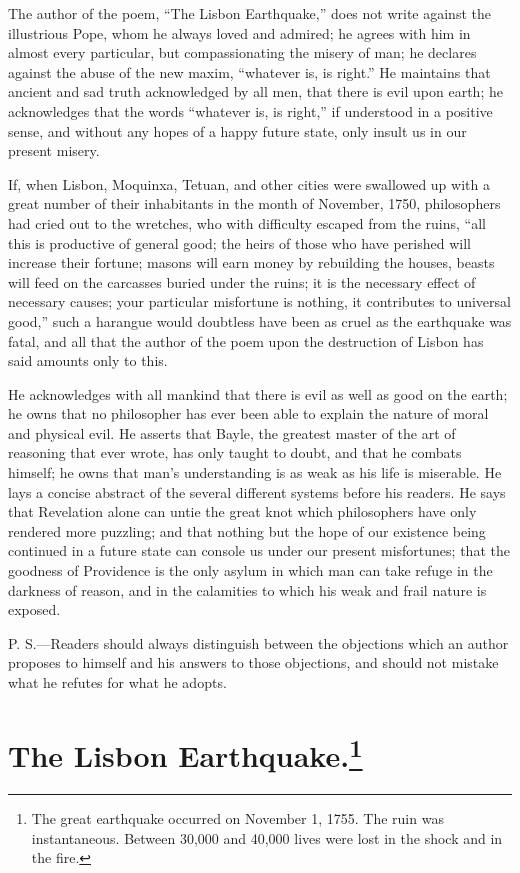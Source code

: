 The author of the poem, ``The Lisbon Earthquake,'' does not write
against the illustrious Pope, whom he always loved and admired; he
agrees with him in almost every particular, but compassionating the
misery of man; he declares against the abuse of the new maxim,
``whatever is, is right.'' He maintains that ancient and sad truth
acknowledged by all men, that there is evil upon earth; he
acknowledges that the words ``whatever is, is right,'' if understood
in a positive sense, and without any hopes of a happy future state,
only insult us in our present misery.

If, when Lisbon, Moquinxa, Tetuan, and other cities were swallowed up
with a great number of their inhabitants in  the month of
November, 1750, philosophers had cried out to the wretches, who with
difficulty escaped from the ruins, ``all this is productive of general
good; the heirs of those who have perished will increase their
fortune; masons will earn money by rebuilding the houses, beasts will
feed on the carcasses buried under the ruins; it is the necessary
effect of necessary causes; your particular misfortune is nothing, it
contributes to universal good,'' such a harangue would doubtless have
been as cruel as the earthquake was fatal, and all that the author of
the poem upon the destruction of Lisbon has said amounts only to this.

He acknowledges with all mankind that there is evil as well as good on
the earth; he owns that no philosopher has ever been able to explain
the nature of moral and physical evil. He asserts that Bayle, the
greatest master of the art of reasoning that ever wrote, has only
taught to doubt, and that he combats himself; he owns that man's
understanding is as weak as his life is miserable. He lays a concise
abstract of the several different systems before his readers. He says
that Revelation alone can untie the great knot which philosophers have
only rendered more puzzling; and that nothing but the hope of our
existence being continued in a future state can console us under our
present misfortunes; that the goodness of Providence is the only
asylum in which man can take refuge in the darkness of reason, and in
the calamities to which his weak and frail nature is exposed.

P. S.---Readers should always distinguish between the objections which
an author proposes to himself and his answers to those objections, and
should not mistake what he refutes for what he adopts.

\section*{The Lisbon Earthquake.\footnote{The great earthquake
occurred on November 1, 1755. The ruin was instantaneous. Between
30,000 and 40,000 lives were lost in the shock and in the fire.}}

